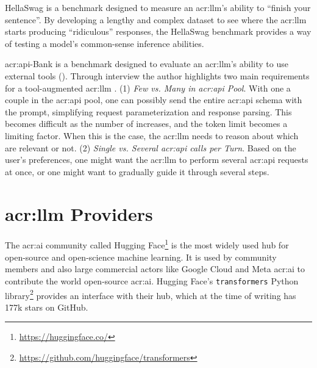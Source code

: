 HellaSwag \citep{zellersHellaSwagCanMachine2019} is a benchmark designed to measure an \acrshort{acr:llm}'s ability to \enquote{finish your sentence}. By developing a lengthy and complex dataset to see where the \acrshort{acr:llm} starts producing \enquote{ridiculous} responses, the HellaSwag benchmark provides a way of testing a model's common-sense inference abilities.

\acrshort{acr:api}-Bank \citep{liAPIBankComprehensiveBenchmark2023} is a benchmark designed to evaluate an \acrshort{acr:llm}'s ability to use external tools (). Through interview the author highlights two main requirements for a tool-augmented \acrshort{acr:llm} \citep[2]{liAPIBankComprehensiveBenchmark2023}. (1) \textit{Few vs. Many  in \acrshort{acr:api} Pool}. With one a couple  in the \acrshort{acr:api} pool, one can possibly send the entire \acrshort{acr:api} schema with the prompt, simplifying request parameterization and response parsing. This becomes difficult as the number of  increases, and the token limit becomes a limiting factor. When this is the case, the \acrshort{acr:llm} needs to reason about which  are relevant or not. (2) \textit{Single vs. Several \acrshort{acr:api} calls per Turn}. Based on the user's preferences, one might want the \acrshort{acr:llm} to perform several \acrshort{acr:api} requests at once, or one might want to gradually guide it through several steps.



\section[LLM providers]{\acrlong{acr:llm} Providers}\label{sec:llm-providers}

The \acrshort{acr:ai} community called Hugging Face\footnote{\url{https://huggingface.co/}} is the most widely used hub for open-source and open-science machine learning. It is used by community members and also large commercial actors like Google Cloud and Meta \acrshort{acr:ai} to contribute the world open-source \acrshort{acr:ai}. Hugging Face's \texttt{transformers} Python library\footnote{\url{https://github.com/huggingface/transformers}} provides an interface with their hub, which at the time of writing has 177k stars on GitHub.

